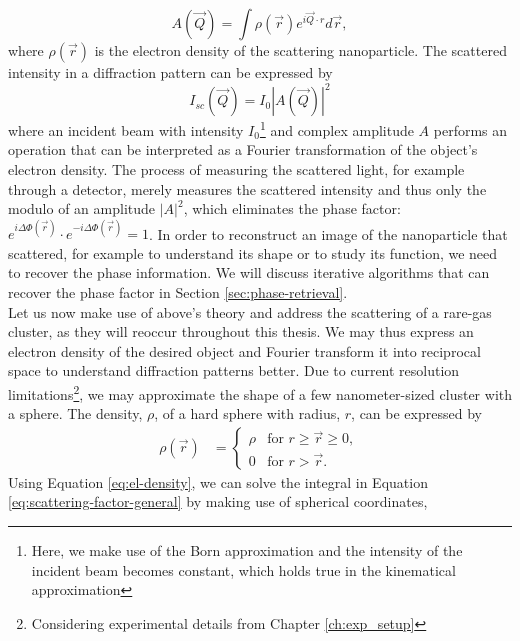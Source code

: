 \begin{equation}
A(\vec{Q})=\int \rho\left(\vec{r}\right) e^{i \vec{Q}\cdot r}d\vec{r},
\label{eq:scattering-factor-general}
\end{equation}
where $\rho\left(\vec{r}\right)$ is the electron density of the scattering nanoparticle. The scattered intensity in a diffraction pattern can be expressed by
\begin{equation}
I_{sc}\left(\vec{Q}\right)=I_{0}\left|A(\vec{Q})\right|^{2}
\label{eq:scattered-intensity}
\end{equation}
where an incident beam with intensity $I_{0}$\footnote{Here, we make use of the Born approximation and the intensity of the incident beam becomes constant, which holds true in the kinematical approximation} and complex amplitude $A$ performs an operation that can be interpreted as a Fourier transformation of the object's electron density. The process of measuring the scattered light, for example through a detector, merely measures the scattered intensity and thus only the modulo of an amplitude $\left|A\right|^{2}$, which eliminates the phase factor: $e^{i\Delta\Phi\left(\vec{r}\right)}\cdot e^{-i\Delta\Phi\left(\vec{r}\right)}=1$. In order to reconstruct an image of the nanoparticle that scattered, for example to understand its shape or to study its function, we need to recover the phase information. We will discuss iterative algorithms that can recover the phase factor in Section \ref{sec:phase-retrieval}.\\[1\baselineskip]
%
Let us now make use of above's theory and address the scattering of a rare-gas cluster, as they will reoccur throughout this thesis. We may thus express an electron density of the desired object and Fourier transform it into reciprocal space to understand diffraction patterns better. Due to current resolution limitations\footnote{Considering experimental details from Chapter \ref{ch:exp_setup}}, we may approximate the shape of a few nanometer-sized cluster with a sphere. The density, $\rho$, of a hard sphere with radius, $r$, can be expressed by 
\begin{align}
\rho\left(\vec{r}\right)&=\begin{cases}
\rho& \text{for $r \geq \vec{r} \geq 0$},\\
0&\text{for $r > \vec{r}$}.
\end{cases}
\label{eq:el-density}
\end{align}
Using Equation \eqref{eq:el-density}, we can solve the integral in Equation \eqref{eq:scattering-factor-general} by making use of spherical coordinates,
